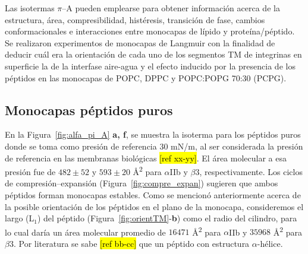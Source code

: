 Las isotermas $\pi$--A pueden emplearse para obtener información acerca de la estructura, área, compresibilidad, histéresis, transición de fase, cambios conformacionales e interacciones entre monocapas de lípido y proteína/péptido. Se realizaron experimentos de monocapas de Langmuir con la finalidad de deducir cuál era la orientación de cada uno de los segmentos \ac{TM} de integrinas en superficie la de la interfase aire-agua y el efecto inducido por la presencia de los péptidos en las monocapas de POPC, DPPC y POPC:POPG 70:30 (PCPG).

\subsection{Monocapas péptidos puros}

En la Figura~\ref{fig:alfa_pi_A} \textbf{a, f}, se muestra la isoterma para los péptidos puros donde se toma como presión de referencia 30 mN/m, al ser considerada la presión de referencia en las membranas biológicas \hl{[ref xx-yy]}. El área molecular a esa presión fue de $482 \pm 52$ y $593 \pm 20$ Å\textsuperscript{2} para $\alpha$IIb y $\beta$3, respectivamente. Los ciclos de compresión--expansión (Figura~\ref{fig:compre_expan}) sugieren que ambos péptidos forman monocapas estables. Como se mencionó anteriormente acerca de la posible orientación de los péptidos en el plano de la monocapa, consideremos el largo (L$_1$) del péptido (Figura~\ref{fig:orientTM}-\textbf{b}) como el radio del cilindro, para lo cual daría un área molecular promedio de $16471$ Å\textsuperscript{2} para $\alpha$IIb y $35968$ Å\textsuperscript{2} para $\beta$3. Por literatura se sabe \hl{[ref bb-cc]} que un péptido con estructura $\alpha$-hélice.

